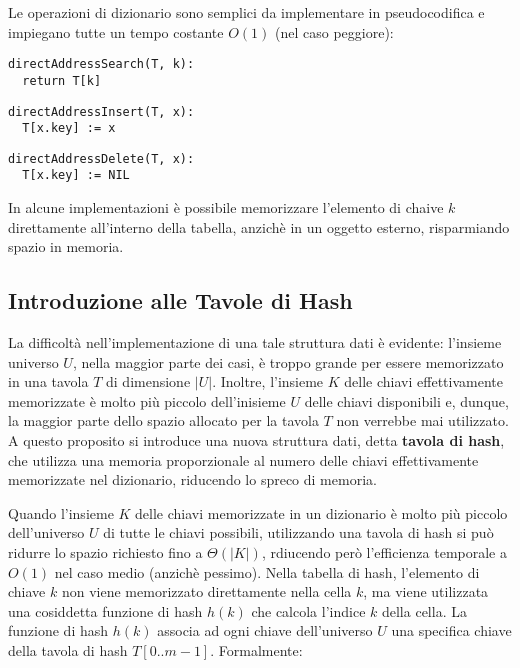 Le operazioni di dizionario sono semplici da implementare in pseudocodifica e impiegano tutte un tempo costante \(O(1)\) (nel caso peggiore):

\begin{lstlisting}
directAddressSearch(T, k):
  return T[k]
\end{lstlisting}

\begin{lstlisting}
directAddressInsert(T, x):
  T[x.key] := x 
\end{lstlisting}

\begin{lstlisting}
directAddressDelete(T, x):
  T[x.key] := NIL
\end{lstlisting}

In alcune implementazioni è possibile memorizzare l'elemento di chaive \(k\) direttamente all'interno della tabella, anzichè in un oggetto esterno, risparmiando spazio in memoria. 

\subsection{Introduzione alle Tavole di Hash}

La difficoltà nell'implementazione di una tale struttura dati è evidente: l'insieme universo \(U\), nella maggior parte dei casi, è troppo grande per essere memorizzato in una tavola \(T\) di dimensione \(|U|\). Inoltre, l'insieme \(K\) delle chiavi effettivamente memorizzate è molto più piccolo dell'inisieme \(U\) delle chiavi disponibili e, dunque, la maggior parte dello spazio allocato per la tavola \(T\) non verrebbe mai utilizzato. A questo proposito si introduce una nuova struttura dati, detta \textbf{tavola di hash}, che utilizza una memoria proporzionale al numero delle chiavi effettivamente memorizzate nel dizionario, riducendo lo spreco di memoria. 

Quando l'insieme \(K\) delle chiavi memorizzate in un dizionario è molto più piccolo dell'universo \(U\) di tutte le chiavi possibili, utilizzando una tavola di hash si può ridurre lo spazio richiesto fino a \(\Theta(|K|)\), rdiucendo però l'efficienza temporale a \(O(1)\) nel caso medio (anzichè pessimo). Nella tabella di hash, l'elemento di chiave \(k\) non viene memorizzato direttamente nella cella \(k\), ma viene utilizzata una cosiddetta funzione di hash \(h(k)\) che calcola l'indice \(k\) della cella. La funzione di hash \(h(k)\) associa ad ogni chiave dell'universo \(U\) una specifica chiave della tavola di hash \(T[0..m-1]\). Formalmente:


